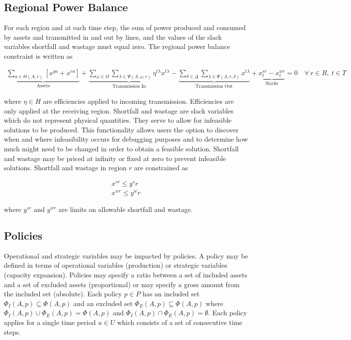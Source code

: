 \subsection{Regional Power Balance}

For each region and at each time step, the sum of power produced and consumed by assets and transmitted in and out by lines, and the values of the slack variables shortfall and wastage must equal zero. The regional power balance constraint is written as

\begin{gather}
	\underbrace{\sum_{a \in \Theta(A, r)} \left[x^{ga} + x^{ea}\right]}_{\text{Assets}} + \underbrace{\sum_{\omega \in \Omega}\sum_{\lambda \in \Psi(\Lambda, \omega, r)} \eta^{t\lambda}x^{t\lambda}}_{\text{Transmission In}} - \underbrace{\sum_{\delta \in \Delta}\sum_{\lambda \in \Psi(\Lambda, r, \delta)} x^{t\lambda}}_{\text{Transmission Out}} + \underbrace{x^{sr}_t - x^{wr}_t}_{\text{Slacks}} = 0 \quad \forall\ r \in R, \ t\in T
\end{gather}

where $\eta \in H$ are efficiencies applied to incoming transmission. Efficiencies are only applied at the receiving region. Shortfall and wastage are slack variables which do not represent physical quantities. They serve to allow for infeasible solutions to be produced. This functionality allows users the option to discover when and where infeasibility occurs for debugging purposes and to determine how much might need to be changed in order to obtain a feasible solution. Shortfall and wastage may be priced at infinity or fixed at zero to prevent infeasible solutions. Shortfall and wastage in region $r$ are constrained as

\begin{gather}
	x^{sr} \leq y^sr \\
	x^{wr} \leq y^wr
\end{gather}

where $y^{sr}$ and $y^{wr}$ are limits on allowable shortfall and wastage.


\subsection{Policies}

Operational and strategic variables may be impacted by policies. A policy may be defined in terms of operational variables (production) or strategic variables (capacity expansion). Policies may specify a ratio between a set of included assets and a set of excluded assets (proportional) or may specify a gross amount from the included set (absolute). Each policy $p \in P$ has an included set $\Phi_I(A, p) \subseteq \Phi(A, p)$ and an excluded set $\Phi_E(A, p) \subseteq \Phi(A, p)$ where $\Phi_I(A, p) \cup \Phi_E(A, p) = \Phi(A, p)$ and $\Phi_I(A, p) \cap \Phi_E(A, p) = \emptyset$. Each policy applies for a single time period $u \in U$ which consists of a set of consecutive time steps.

